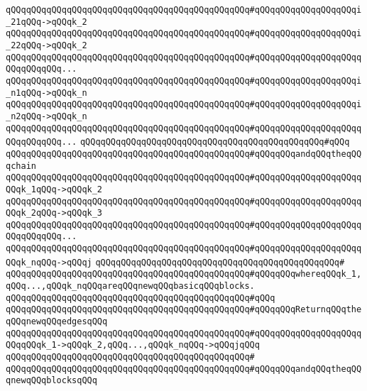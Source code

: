 \verb|qQQqqQQqqQQqqQQqqQQqqQQqqQQqqQQqqQQqqQQqqQQqqQQq#qQQqqQQqqQQqqQQqqQQqi_21qQQq->qQQqk_2|\newline
\verb|qQQqqQQqqQQqqQQqqQQqqQQqqQQqqQQqqQQqqQQqqQQqqQQq#qQQqqQQqqQQqqQQqqQQqi_22qQQq->qQQqk_2|\newline
\verb|qQQqqQQqqQQqqQQqqQQqqQQqqQQqqQQqqQQqqQQqqQQqqQQq#qQQqqQQqqQQqqQQqqQQqqQQqqQQqqQQq...|\newline
\verb|qQQqqQQqqQQqqQQqqQQqqQQqqQQqqQQqqQQqqQQqqQQqqQQq#qQQqqQQqqQQqqQQqqQQqi_n1qQQq->qQQqk_n|\newline
\verb|qQQqqQQqqQQqqQQqqQQqqQQqqQQqqQQqqQQqqQQqqQQqqQQq#qQQqqQQqqQQqqQQqqQQqi_n2qQQq->qQQqk_n|\newline
\verb|qQQqqQQqqQQqqQQqqQQqqQQqqQQqqQQqqQQqqQQqqQQqqQQq#qQQqqQQqqQQqqQQqqQQqqQQqqQQqqQQq...|\newline
\verb|qQQqqQQqqQQqqQQqqQQqqQQqqQQqqQQqqQQqqQQqqQQqqQQq#qQQq|\newline
\verb|qQQqqQQqqQQqqQQqqQQqqQQqqQQqqQQqqQQqqQQqqQQqqQQq#qQQqqQQqandqQQqtheqQQqchain|\newline
\verb|qQQqqQQqqQQqqQQqqQQqqQQqqQQqqQQqqQQqqQQqqQQqqQQq#qQQqqQQqqQQqqQQqqQQqqQQqk_1qQQq->qQQqk_2|\newline
\verb|qQQqqQQqqQQqqQQqqQQqqQQqqQQqqQQqqQQqqQQqqQQqqQQq#qQQqqQQqqQQqqQQqqQQqqQQqk_2qQQq->qQQqk_3|\newline
\verb|qQQqqQQqqQQqqQQqqQQqqQQqqQQqqQQqqQQqqQQqqQQqqQQq#qQQqqQQqqQQqqQQqqQQqqQQqqQQqqQQq...|\newline
\verb|qQQqqQQqqQQqqQQqqQQqqQQqqQQqqQQqqQQqqQQqqQQqqQQq#qQQqqQQqqQQqqQQqqQQqqQQqk_nqQQq->qQQqj|\newline
\verb|qQQqqQQqqQQqqQQqqQQqqQQqqQQqqQQqqQQqqQQqqQQqqQQq#|\newline
\verb|qQQqqQQqqQQqqQQqqQQqqQQqqQQqqQQqqQQqqQQqqQQqqQQq#qQQqqQQqwhereqQQqk_1,qQQq...,qQQqk_nqQQqareqQQqnewqQQqbasicqQQqblocks.|\newline
\verb|qQQqqQQqqQQqqQQqqQQqqQQqqQQqqQQqqQQqqQQqqQQqqQQq#qQQq|\newline
\verb|qQQqqQQqqQQqqQQqqQQqqQQqqQQqqQQqqQQqqQQqqQQqqQQq#qQQqqQQqReturnqQQqtheqQQqnewqQQqedgesqQQq|\newline
\verb|qQQqqQQqqQQqqQQqqQQqqQQqqQQqqQQqqQQqqQQqqQQqqQQq#qQQqqQQqqQQqqQQqqQQqqQQqqQQqk_1->qQQqk_2,qQQq...,qQQqk_nqQQq->qQQqjqQQq|\newline
\verb|qQQqqQQqqQQqqQQqqQQqqQQqqQQqqQQqqQQqqQQqqQQqqQQq#|\newline
\verb|qQQqqQQqqQQqqQQqqQQqqQQqqQQqqQQqqQQqqQQqqQQqqQQq#qQQqqQQqandqQQqtheqQQqnewqQQqblocksqQQq|\newline

